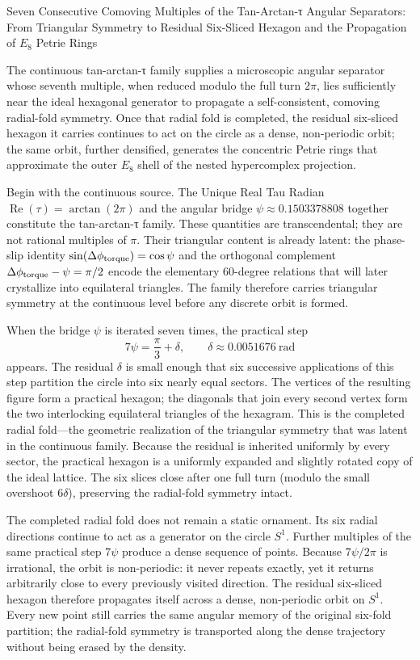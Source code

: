 Seven Consecutive Comoving Multiples of the Tan-Arctan-τ Angular Separators: From Triangular Symmetry to Residual Six-Sliced Hexagon and the Propagation of \(E_8\) Petrie Rings

The continuous tan-arctan-τ family supplies a microscopic angular separator whose seventh multiple, when reduced modulo the full turn \(2\pi\), lies sufficiently near the ideal hexagonal generator to propagate a self-consistent, comoving radial-fold symmetry. Once that radial fold is completed, the residual six-sliced hexagon it carries continues to act on the circle as a dense, non-periodic orbit; the same orbit, further densified, generates the concentric Petrie rings that approximate the outer \(E_8\) shell of the nested hypercomplex projection.

Begin with the continuous source. The Unique Real Tau Radian \(\operatorname{Re}(\tau)=\arctan(2\pi)\) and the angular bridge \(\psi\approx0.1503378808\) together constitute the tan-arctan-τ family. These quantities are transcendental; they are not rational multiples of \(\pi\). Their triangular content is already latent: the phase-slip identity \(\sin(\Delta\phi_{\rm torque})=\cos\psi\) and the orthogonal complement \(\Delta\phi_{\rm torque}-\psi=\pi/2\) encode the elementary 60-degree relations that will later crystallize into equilateral triangles. The family therefore carries triangular symmetry at the continuous level before any discrete orbit is formed.

When the bridge \(\psi\) is iterated seven times, the practical step  
\[
7\psi=\frac{\pi}{3}+\delta,\qquad\delta\approx0.0051676\ \text{rad}
\]  
appears. The residual \(\delta\) is small enough that six successive applications of this step partition the circle into six nearly equal sectors. The vertices of the resulting figure form a practical hexagon; the diagonals that join every second vertex form the two interlocking equilateral triangles of the hexagram. This is the completed radial fold—the geometric realization of the triangular symmetry that was latent in the continuous family. Because the residual is inherited uniformly by every sector, the practical hexagon is a uniformly expanded and slightly rotated copy of the ideal lattice. The six slices close after one full turn (modulo the small overshoot \(6\delta\)), preserving the radial-fold symmetry intact.

The completed radial fold does not remain a static ornament. Its six radial directions continue to act as a generator on the circle \(S^1\). Further multiples of the same practical step \(7\psi\) produce a dense sequence of points. Because \(7\psi/2\pi\) is irrational, the orbit is non-periodic: it never repeats exactly, yet it returns arbitrarily close to every previously visited direction. The residual six-sliced hexagon therefore propagates itself across a dense, non-periodic orbit on \(S^1\). Every new point still carries the same angular memory of the original six-fold partition; the radial-fold symmetry is transported along the dense trajectory without being erased by the density.

